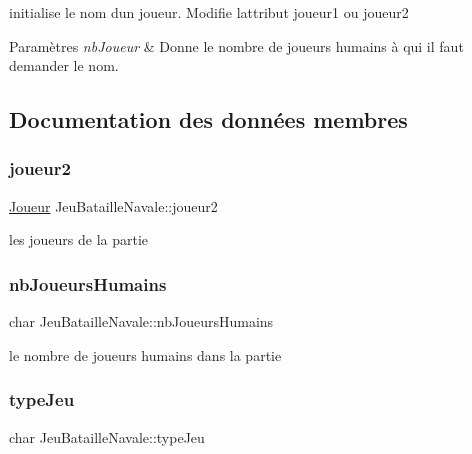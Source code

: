 initialise le nom d\textquotesingle{}un joueur. Modifie l\textquotesingle{}attribut joueur1 ou joueur2 


\begin{DoxyParams}{Paramètres}
{\em nb\+Joueur} & Donne le nombre de joueurs humains à qui il faut demander le nom. \\
\hline
\end{DoxyParams}


\subsection{Documentation des données membres}
\mbox{\label{class_jeu_bataille_navale_a1f339275662a73e0e17ae34a1948c5f9}} 
\subsubsection{\texorpdfstring{joueur2}{joueur2}}
{\footnotesize\ttfamily \mbox{\hyperlink{class_joueur}{Joueur}} Jeu\+Bataille\+Navale\+::joueur2\hspace{0.3cm}{\ttfamily [private]}}

les joueurs de la partie \mbox{\label{class_jeu_bataille_navale_af35393d1b2ba1d0984414fed7b887875}} 
\subsubsection{\texorpdfstring{nb\+Joueurs\+Humains}{nbJoueursHumains}}
{\footnotesize\ttfamily char Jeu\+Bataille\+Navale\+::nb\+Joueurs\+Humains\hspace{0.3cm}{\ttfamily [private]}}

le nombre de joueurs humains dans la partie \mbox{\label{class_jeu_bataille_navale_abac1f29d41caf119a9766f323506dbe0}} 
\subsubsection{\texorpdfstring{type\+Jeu}{typeJeu}}
{\footnotesize\ttfamily char Jeu\+Bataille\+Navale\+::type\+Jeu\hspace{0.3cm}{\ttfamily [private]}}

